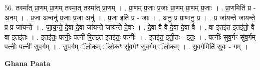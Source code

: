 \documentclass[17pt]{extarticle}
\begin{document}
56. तस्मा᳚त् प्रा॒णम् प्रा॒णम् तस्मा॒त् तस्मा᳚त् प्रा॒णम् । . प्रा॒णम् प्र॒जाः प्र॒जाः प्रा॒णम् प्रा॒णम् प्र॒जाः । . प्रा॒णमिति॑ प्र - अ॒नम् । . प्र॒जा अन्वनु॑ प्र॒जाः प्र॒जा अनु॑ । . प्र॒जा इति॑ प्र - जाः । . अनु॒ प्र प्राण्वनु॒ प्र । . प्र जा॑यन्ते जायन्ते॒ प्र प्र जा॑यन्ते । . जा॒य॒न्ते॒ दे॒वा दे॒वा जा॑यन्ते जायन्ते दे॒वाः । . दे॒वा वै वै दे॒वा दे॒वा वै । . वा इ॒त‌इ॑त इ॒त‌इ॑तो॒ वै वा इ॒त‌इ॑तः । . इ॒त‌इ॑तः॒ पत्नीः॒ पत्नी॑ रि॒त‌इ॑त इ॒त‌इ॑तः॒ पत्नीः᳚ । . इ॒त‌इ॑त॒ इती॒तः - इ॒तः॒ । . पत्नीः᳚ सुव॒र्गꣳ सु॑व॒र्गम् पत्नीः॒ पत्नीः᳚ सुव॒र्गम् । . सु॒व॒र्गम् ॅलो॒कम् ॅलो॒कꣳ सु॑व॒र्गꣳ सु॑व॒र्गम् ॅलो॒कम् । . सु॒व॒र्गमिति॑ सुवः - गम् । \newline

\textbf{Ghana Paata } \newline
\end{document}
